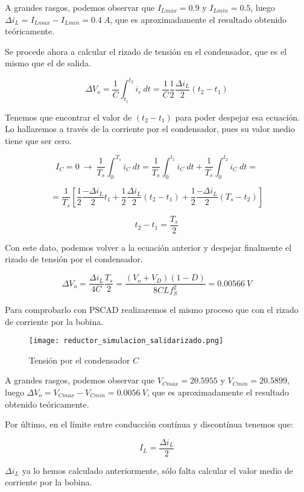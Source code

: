 \documentclass[10pt]{article}
\begin{document}
	A grandes rasgos, podemos observar que $I_{L{max}}=0.9$ y $I_{L{min}}=0.5$, luego $\Delta{i_L} = I_{L{max}} - I_{L{min}} = 0.4\ A$, que es aproximadamente el resultado obtenido teóricamente.
	
	Se procede ahora a calcular el rizado de tensión en el condensador, que es el mismo que el de salida.
	
	$$\Delta{V_o}= \frac{1}{C}\int_{t_1}^{t_2}i_c\ dt= \frac{1}{C}\frac{1}{2}\frac{\Delta{i_L}}{2}(t_2-t_1)$$
	
	Tenemos que encontrar el valor de $(t_2-t_1)$ para poder despejar esa ecuación. Lo hallaremos a través de la corriente por el condensador, pues su valor medio tiene que ser cero.
	
	$$I_C=0\ \rightarrow\ \frac{1}{T_s}\int_{0}^{T_s}i_C\ dt= \frac{1}{T_s}\int_{0}^{t_1}i_C\ dt+\frac{1}{T_s}\int_{0}^{t_2}i_C\ dt= $$
	
	$$=\frac{1}{T_s}\left[\frac{1}{2}\frac{-\Delta{i_L}}{2}t_1+\frac{1}{2}\frac{\Delta{i_L}}{2}(t_2-t_1)+\frac{1}{2}\frac{-\Delta{i_L}}{2}(T_s-t_2)\right]$$
	
	$$t_2-t_1=\frac{T_s}{2}$$
	
	Con este dato, podemos volver a la ecuación anterior y despejar finalmente el rizado de tensión por el condensador.
	
	$$\Delta V_o=\frac{\Delta{i_L}}{4C}\frac{T_s}{2}=\frac{(V_o+V_D)(1-D)}{8CLf_S^2}= 0.00566\ V$$
	
	Para comprobarlo con PSCAD realizaremos el mismo proceso que con el rizado de corriente por la bobina.
	
	\begin{figure}[H]
		\begin{center}
			\texttt{[image: reductor\_simulacion\_salidarizado.png]}
		\end{center}\caption{Tensión por el condensador $C$}
	\end{figure}

	A grandes rasgos, podemos observar que $V_{Cmax}=20.5955$ y $V_{Cmin}=20.5899$, luego $\Delta{V_o} = V_{Cmax} - V_{Cmin} = 0.0056\ V$, que es aproximadamente el resultado obtenido teóricamente.
	
	\newpage

	Por último, en el límite entre conducción contínua y discontínua tenemos que: 
	
	$$I_L=\frac{\Delta{i_L}}{2}$$
	
	$\Delta{i_L}$ ya lo hemos calculado anteriormente, sólo falta calcular el valor medio de corriente por la bobina.
	
\end{document}
